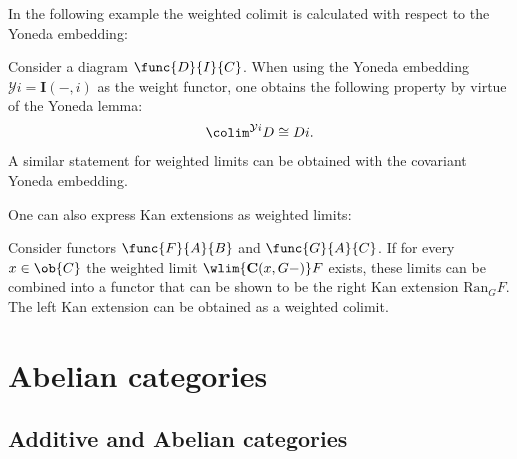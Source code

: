     In the following example the weighted colimit is calculated with respect to the Yoneda embedding:
    \begin{example}
        Consider a diagram $\func{D}{I}{C}$. When using the Yoneda embedding $\mathcal{Y}i = \mathbf{I}(-,i)$ as the weight functor, one obtains the following property by virtue of the Yoneda lemma:
        \begin{gather}
            \label{cat:weighted_hom_colimit}
            \colim^{\mathcal{Y}i}D\cong Di.
        \end{gather}
        A similar statement for weighted limits can be obtained with the covariant Yoneda embedding.
    \end{example}

    One can also express Kan extensions as weighted limits:
    \begin{property}
        Consider functors $\func{F}{A}{B}$ and $\func{G}{A}{C}$. If for every $x\in\ob{C}$ the weighted limit $\wlim{\mathbf{C}(x,G-)}F$ exists, these limits can be combined into a functor that can be shown to be the right Kan extension $\text{Ran}_GF$. The left Kan extension can be obtained as a weighted colimit.
    \end{property}

\section{Abelian categories}\label{section:abelian_categories}
\subsection{Additive and Abelian categories}

